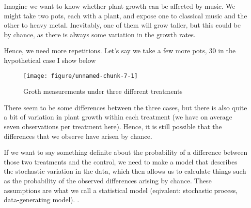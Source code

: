 \documentclass[a4paper,twoside]{tufte-book}\usepackage[]{graphicx}\usepackage[]{color}
\makeatletter
\def\maxwidth{ %
	\ifdim\Gin@nat@width>\linewidth
	\linewidth
	\else
	\Gin@nat@width
	\fi
}
\makeatother
\begin{document}

Imagine we want to know whether plant growth can be affected by music. We might take two pots, each with a plant, and expose one to classical music and the other to heavy metal. Inevitably, one of them will grow taller, but this could be by chance, as there is always some variation in the growth rates. 

Hence, we need more repetitions. Let's say we take a few more pots, 30 in the hypothetical case I show below

\begin{figure}[htbp]
\begin{center}
\begin{Schunk}

\texttt{[image: figure/unnamed-chunk-7-1]} \end{Schunk}
\caption{Groth measurements under three different treatments}
\label{fig: plant growth music}
\end{center}
\end{figure}

There seem to be some differences between the three cases, but there is also quite a bit of variation in plant growth within each treatment (we have on average seven observations per treatment here). Hence, it is still possible that the differences that we observe have arisen by chance. 

If we want to say something definite about the probability of a difference between those two treatments and the control, we need to make a model that describes the stochastic variation in the data, which then allows us to calculate things such as the probability of the observed differences arising by chance. These assumptions are what we call a statistical model (eqivalent: stochastic process, data-generating model). . 
\end{document}
